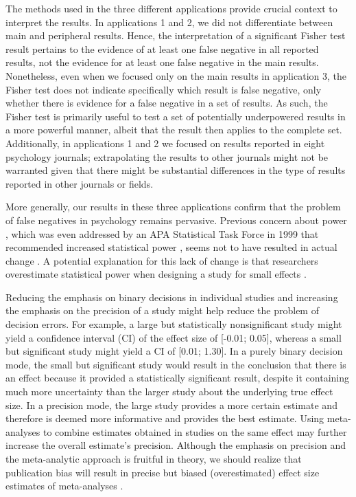\documentclass{article}
\begin{document}
The methods used in the three different applications provide crucial context to interpret the results. In applications 1 and 2, we did not differentiate between main and peripheral results. Hence, the interpretation of a significant Fisher test result pertains to the evidence of at least one false negative in all reported results, not the evidence for at least one false negative in the main results. Nonetheless, even when we focused only on the main results in application 3, the Fisher test does not indicate specifically which result is false negative, only whether there is evidence for a false negative in a set of results. As such, the Fisher test is primarily useful to test a set of potentially underpowered results in a more powerful manner, albeit that the result then applies to the complete set. Additionally, in applications 1 and 2 we focused on results reported in eight psychology journals; extrapolating the results to other journals might not be warranted given that there might be substantial differences in the type of results reported in other journals or fields. 

More generally, our results in these three applications confirm that the problem of false negatives in psychology remains pervasive. Previous concern about power \cite{Cohen1962-jc,Sedlmeier1989-yc,Bakker2012-tf,Marszalek2011-rf}, which was even addressed by an APA Statistical Task Force in 1999 that recommended increased statistical power \cite{Wilkinson_APA_Task_Force_on_Statistical_Inference1999-ht}, seems not to have resulted in actual change \cite{Marszalek2011-rf}. A potential explanation for this lack of change is that researchers overestimate statistical power when designing a study for small effects \cite{Bakker2016-nj}.

Reducing the emphasis on binary decisions in individual studies and increasing the emphasis on the precision of a study might help reduce the problem of decision errors. For example, a large but statistically nonsignificant study might yield a confidence interval (CI) of the effect size of [-0.01; 0.05], whereas a small but significant study might yield a CI of [0.01; 1.30]. In a purely binary decision mode, the small but significant study would result in the conclusion that there is an effect because it provided a statistically significant result, despite it containing much more uncertainty than the larger study about the underlying true effect size. In a precision mode, the large study provides a more certain estimate and therefore is deemed more informative and provides the best estimate. Using meta-analyses to combine estimates obtained in studies on the same effect may further increase the overall estimate’s precision. Although the emphasis on precision and the meta-analytic approach is fruitful in theory, we should realize that publication bias will result in precise but biased (overestimated) effect size estimates of meta-analyses \cite{Nuijten2015-kh}.
\end{document}

